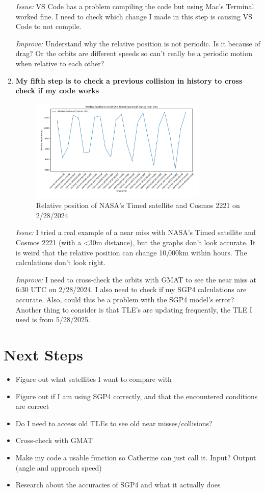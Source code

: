 \documentclass[12pt]{report}
\begin{document}
\begin{enumerate}
  \textit{Issue:} VS Code has a problem compiling the code but using Mac’s Terminal worked fine. I need to check which change I made in this step is causing VS Code to not compile.

  \textit{Improve:} Understand why the relative position is not periodic. Is it because of drag? Or the orbits are different speeds so can’t really be a periodic motion when relative to each other?
  

  \newpage
  \item \textbf{My fifth step is to check a previous collision in history to cross check if my code works}

  \begin{figure}[H]
    \centering
    \includegraphics[width=0.8\textwidth]{figure_timed_near_miss.png}
    \caption{Relative position of NASA's Timed satellite and Cosmos 2221 on 2/28/2024}
    \label{fig:orbit}
  \end{figure}


  \textit{Issue:} I tried a real example of a near miss with NASA’s Timed satellite and Cosmos 2221 (with a \textless{}30m distance), but the graphs don’t look accurate. It is weird that the relative position can change 10,000km within hours. The calculations don’t look right.

  \textit{Improve:} I need to cross-check the orbits with GMAT to see the near miss at 6:30 UTC on 2/28/2024. I also need to check if my SGP4 calculations are accurate. Also, could this be a problem with the SGP4 model’s error? Another thing to consider is that TLE’s are updating frequently, the TLE I used is from 5/28/2025.
\end{enumerate}

\chapter*{Next Steps}
\begin{itemize}
  \item Figure out what satellites I want to compare with
  \item Figure out if I am using SGP4 correctly, and that the encountered conditions are correct
  \item Do I need to access old TLEs to see old near misses/collisions?
  \item Cross-check with GMAT
  \item Make my code a usable function so Catherine can just call it. Input? \textrightarrow{} Output (angle and approach speed)
  \item Research about the accuracies of SGP4 and what it actually does
\end{itemize}
\end{document}
